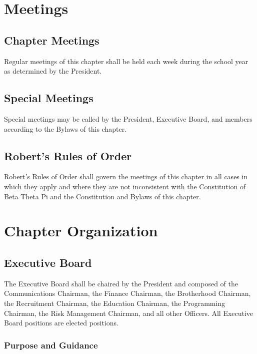 \chapter{Meetings}
\label{cha:meetings}

\section{Chapter Meetings}
\label{sec:chapter-meetings}

Regular meetings of this chapter shall be held each week during the school year
as determined by the President.

\section{Special Meetings}
\label{sec:special-meetings}

Special meetings may be called by the President, Executive Board, and members
according to the Bylaws of this chapter.

\section{Robert's Rules of Order}
\label{sec:roberts-rules-of-order}

Robert's Rules of Order shall govern the meetings of this chapter in all cases
in which they apply and where they are not inconsistent with the Constitution of
Beta Theta Pi and the Constitution and Bylaws of this chapter.

\chapter{Chapter Organization}
\label{cha:chapter-organization}

\section{Executive Board}
\label{sec:executive-board}

The Executive Board shall be chaired by the President and composed of the
Communications Chairman, the Finance Chairman, the Brotherhood Chairman, the
Recruitment Chairman, the Education Chairman, the Programming Chairman, the Risk
Management Chairman, and all other Officers.
All Executive Board positions are elected positions.

\subsection{Purpose and Guidance}
\label{sec:purpose-and-guidelines}

